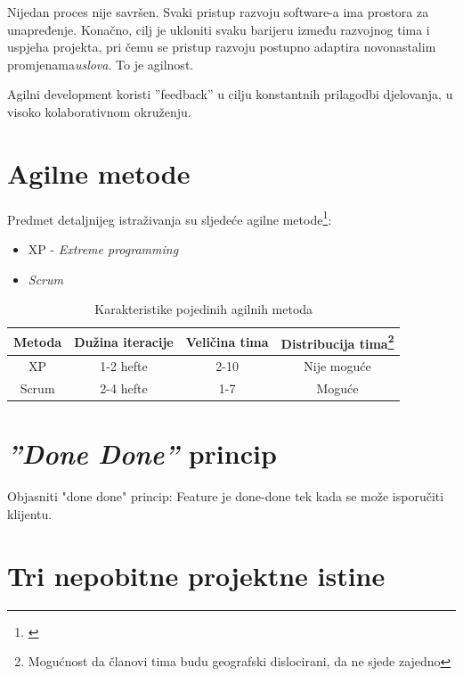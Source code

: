 \documentclass[lmodern, utf8, zavrsni]{fit}
\begin{document}
Nijedan proces nije savršen. Svaki pristup razvoju software-a ima prostora za unapređenje. Konačno, cilj je ukloniti svaku barijeru između razvojnog tima i uspjeha projekta, pri čemu se pristup razvoju postupno adaptira novonastalim promjenama\emph{uslova}. To je agilnost.\citep[str 355]{agileart}

Agilni development koristi ''feedback'' u cilju konstantnih prilagodbi djelovanja, u visoko kolaborativnom okruženju. \citep{agileprag}

\section{Agilne metode}

Predmet detaljnijeg istraživanja su sljedeće agilne metode\footnote{\citep{agiledacs}}:
\begin{itemize}
  \item XP - \emph{Extreme programming}
  \item \emph{Scrum}
\end{itemize}

\begin{savenotes}
\begin{table}[ht]
\centering
\begin{tabular}{c c c c}
\hline\hline
Metoda & Dužina iteracije & Veličina tima & Distribucija tima\footnote{{Mogućnost da članovi tima budu geografski dislocirani, da ne sjede zajedno}} \\
\hline
   XP  & 1-2 hefte & 2-10 & Nije moguće \\
  Scrum & 2-4 hefte & 1-7 & Moguće \\ [1ex]
\hline
\end{tabular}
\label{table:methodkarakteristike}
\caption{Karakteristike pojedinih agilnih metoda}
\end{table}
\end{savenotes}


\section{\emph{''Done Done''} princip}

Objasniti "done done" princip: Feature je done-done tek kada se može isporučiti klijentu.

\section{Tri nepobitne projektne istine}
\end{document}
